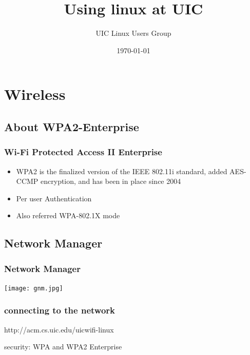 \documentclass[hyperref={pdfpagelabels=false}]{beamer}
\title{Using linux at UIC}
\author{UIC Linux Users Group}
\date{\today}
\begin{document}
\frame{\titlepage}
\section{Wireless}
\subsection{About WPA2-Enterprise}
\frame
{
    \frametitle{Wi-Fi Protected Access II Enterprise}
    \begin{itemize}
    \item{WPA2 is the finalized version of the IEEE 802.11i standard, added AES-CCMP encryption, and has been in place since 2004}
    \item{Per user Authentication}
    \item{Also referred WPA-802.1X mode}
    \end{itemize}
}
\subsection{Network Manager}
\frame
{
    \frametitle{Network Manager}
    
    \texttt{[image: gnm.jpg]}

}
\frame
{
    \frametitle{connecting to the network}
    http://acm.cs.uic.edu/uicwifi-linux

    security: WPA and  WPA2 Enterprise
}
\end{document}
